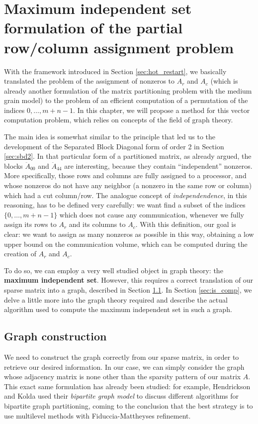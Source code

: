\chapter{Maximum independent set formulation of the partial row/column assignment problem} \label{chap:independent_set}

With the framework introduced in Section \ref{sec:hot_restart}, we basically translated the problem of the assignment of nonzeros to $A_r$ and $A_c$ (which is already another formulation of the matrix partitioning problem with the medium grain model) to the problem of an efficient computation of a permutation of the indices $0,\dots,m+n-1$. In this chapter, we will propose a method for this vector computation problem, which relies on concepts of the field of graph theory.

The main idea is somewhat similar to the principle that led us to the development of the Separated Block Diagonal form of order 2 in Section \ref{sec:sbd2}. In that particular form of a partitioned matrix, as already argued, the blocks $\ddot{A}_{00}$ and $\ddot{A}_{44}$ are interesting, because they contain ``independent'' nonzeros. More specifically, those rows and columns are fully assigned to a processor, and whose nonzeros do not have any neighbor (a nonzero in the same row or column) which had a cut column/row. The analogue concept of \emph{independendence}, in this reasoning, has to be defined very carefully: we want find a subset of the indices $\{0,\dots,m+n-1\}$ which does not cause any communication, whenever we fully assign its rows to $A_r$ and its columns to $A_c$. With this definition, our goal is clear: we want to assign as many nonzeros as possible in this way, obtaining a low upper bound on the communication volume, which can be computed during the creation of $A_r$ and $A_c$.

To do so, we can employ a very well studied object in graph theory: the \textbf{maximum independent set}. However, this requires a correct translation of our sparse matrix into a graph, described in Section \ref{sec:is_graph}. In Section \ref{sec:is_comp}, we delve a little more into the graph theory required and describe the actual algorithm used to compute the maximum independent set in such a graph.

\section{Graph construction} \label{sec:is_graph}

We need to construct the graph correctly from our sparse matrix, in order to retrieve our desired information. In our case, we can simply consider the graph whose adjacency matrix is none other than the sparsity pattern of our matrix $A$. This exact same formulation has already been studied: for example, Hendrickson and Kolda \cite{hendrickson} used their \emph{bipartite graph model} to discuss different algorithms for bipartite graph partitioning, coming to the conclusion that the best strategy is to use multilevel methods with Fiduccia-Mattheyses refinement.

